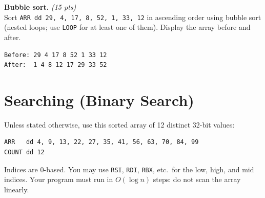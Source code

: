 \documentclass[11pt,letterpaper]{article}
\newcommand{\pts}[1]{\hfill\textit{(#1 pts)}}
\newcommand{\ttl}[1]{\textbf{#1.}}
\begin{document}
\begin{problems}
\item \ttl{Bubble sort} \pts{15}
\\Sort \texttt{ARR dd 29, 4, 17, 8, 52, 1, 33, 12} in ascending order using bubble sort (nested loops; use \texttt{LOOP} for at least one of them). Display the array before and after.
\begin{lstlisting}[style=out]
Before: 29 4 17 8 52 1 33 12
After:  1 4 8 12 17 29 33 52
\end{lstlisting}

\end{problems}

\section{Searching (Binary Search)}

Unless stated otherwise, use this sorted array of 12 distinct 32-bit values:
\begin{lstlisting}
ARR   dd 4, 9, 13, 22, 27, 35, 41, 56, 63, 70, 84, 99
COUNT dd 12
\end{lstlisting}
Indices are 0-based. You may use \texttt{RSI}, \texttt{RDI}, \texttt{RBX}, etc.\ for the low, high, and mid indices. Your program must run in $O(\log n)$ steps: do not scan the array linearly.
\end{document}
